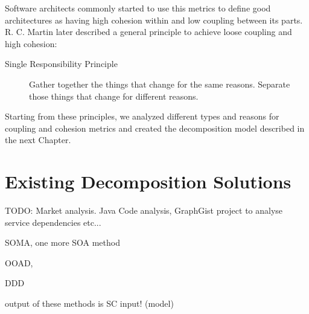 Software architects commonly started to use this metrics to define good architectures as having high cohesion within and low coupling between its parts. R. C. Martin later described a general principle to achieve loose coupling and high cohesion:

\begin{description}
	\item[Single Responsibility Principle] Gather together the things that change for the same reasons. Separate those things that change for different reasons.\cite{SRP}
\end{description}

Starting from these principles, we analyzed different types and reasons for coupling and cohesion metrics and created the decomposition model described in the next Chapter.


\section{Existing Decomposition Solutions}

TODO: Market analysis. Java Code analysis, GraphGist project to analyse service dependencies etc... %

SOMA, one more SOA method

OOAD, 

DDD

output of these methods is SC input! (model)


